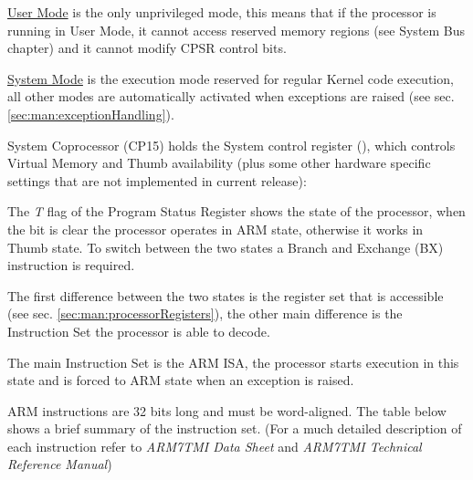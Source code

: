 \uline{User Mode} is the only unprivileged mode, this means that if the processor is running in User Mode, it cannot access reserved memory regions (see System Bus chapter) and it cannot modify CPSR control bits.

\uline{System Mode} is the execution mode reserved for regular Kernel code execution, all other modes are automatically activated when exceptions are raised (see sec. \ref{sec:man:exceptionHandling}).

\label{sec:manual:systemControlRegister}

System Coprocessor (CP15) holds the System control register (), which controls Virtual Memory and Thumb availability (plus some other hardware specific settings that are not implemented in current release):

\vspace{5px}
\begin{adjustbox}{center}

\end{adjustbox}
\vspace{5px}


The \emph{T} flag of the Program Status Register shows the state of the processor, when the bit is clear the processor operates in ARM state, otherwise it works in Thumb state. To switch between the two states a Branch and Exchange (BX) instruction is required.

The first difference between the two states is the register set that is accessible (see sec. \ref{sec:man:processorRegisters}), the other main difference is the Instruction Set the processor is able to decode.


The main Instruction Set is the ARM ISA, the processor starts execution in this state and is forced to ARM state when an exception is raised.

ARM instructions are 32 bits long and must be word-aligned. The table below shows a brief summary of the instruction set. (For a much detailed description of each instruction refer to \emph{ARM7TMI Data Sheet} and \emph{ARM7TMI Technical Reference Manual})

\vspace{5px}
\begin{adjustbox}{center}

\end{adjustbox}
\vspace{5px}

